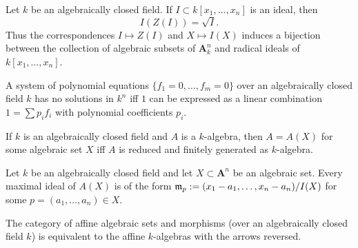 \begin{thm}[Nullstellensatz]
    \label{Nullstellensatz}
    Let $k$ be an algebraically closed field. If $I\subset k[x_1,\ldots,x_n]$ is an ideal, then
    $$I(Z(I))=\sqrt{I}.$$
    Thus the correspondences $I\mapsto Z(I)$ and $X\mapsto I(X)$ induces a bijection between the collection of algebraic
    subsets of $\mathbf{A}^n_k$ and radical ideals of $k[x_1,\ldots,x_n]$.
\end{thm}

\begin{cor}
    A system of polynomial equations $\{f_1=0,\ldots, f_m=0\}$ over an algebraically closed field $k$ has no solutions
    in $k^n$ iff $1$ can be expressed as a linear combination $1=\sum{p_if_i}$ with polynomial coefficients $p_i$.
\end{cor}

\begin{cor}
    If $k$ is an algebraically closed field and $A$ is a $k$-algebra, then $A=A(X)$ for some algebraic set $X$ iff $A$
    is reduced and finitely generated as $k$-algebra.
\end{cor}

\begin{cor}
    Let $k$ be an algebraically closed field and let $X\subset \mathbf{A}^n$ be an algebraic set. Every maximal ideal
    of $A(X)$ is of the form $\mathfrak{m}_p:=(x_1-a_1,\ldots,x_n-a_n)/I(X)$ for some $p=(a_1,\ldots,a_n)\in X$.
\end{cor}

\begin{cor}
    The category of affine algebraic sets and morphisms (over an algebraically closed field $k$) is equivalent to the
    affine $k$-algebras with the arrows reversed.
\end{cor}